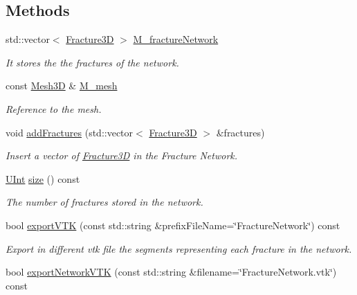 \subsection*{Methods}
\begin{DoxyCompactItemize}
\item 
std\+::vector$<$ \hyperlink{classFVCode3D_1_1Fracture3D}{Fracture3D} $>$ \hyperlink{classFVCode3D_1_1FractureNetwork3D_a1e0856e5834de015bd19c479724b89ba}{M\+\_\+fracture\+Network}
\begin{DoxyCompactList}\small\item\em It stores the the fractures of the network. \end{DoxyCompactList}\item 
const \hyperlink{classFVCode3D_1_1Mesh3D}{Mesh3D} \& \hyperlink{classFVCode3D_1_1FractureNetwork3D_a3f6bc46ab46e3ee7ee608e73694cb87a}{M\+\_\+mesh}
\begin{DoxyCompactList}\small\item\em Reference to the mesh. \end{DoxyCompactList}\item 
void \hyperlink{classFVCode3D_1_1FractureNetwork3D_a1d1ae862d9076988686cef213dc0574d}{add\+Fractures} (std\+::vector$<$ \hyperlink{classFVCode3D_1_1Fracture3D}{Fracture3D} $>$ \&fractures)
\begin{DoxyCompactList}\small\item\em Insert a vector of \hyperlink{classFVCode3D_1_1Fracture3D}{Fracture3D} in the Fracture Network. \end{DoxyCompactList}\item 
\hyperlink{namespaceFVCode3D_a4bf7e328c75d0fd504050d040ebe9eda}{U\+Int} \hyperlink{classFVCode3D_1_1FractureNetwork3D_ab5c6a79673390ecf2edd54232993054c}{size} () const 
\begin{DoxyCompactList}\small\item\em The number of fractures stored in the network. \end{DoxyCompactList}\item 
bool \hyperlink{classFVCode3D_1_1FractureNetwork3D_afaabbabf1e76071af9b0808f8dc6c413}{export\+V\+TK} (const std\+::string \&prefix\+File\+Name=\char`\"{}Fracture\+Network\char`\"{}) const 
\begin{DoxyCompactList}\small\item\em Export in different vtk file the segments representing each fracture in the network. \end{DoxyCompactList}\item 
bool \hyperlink{classFVCode3D_1_1FractureNetwork3D_ab4a7dea9b15402cb2c82cf501c7e2356}{export\+Network\+V\+TK} (const std\+::string \&filename=\char`\"{}Fracture\+Network.\+vtk\char`\"{}) const 

\end{DoxyCompactItemize}
